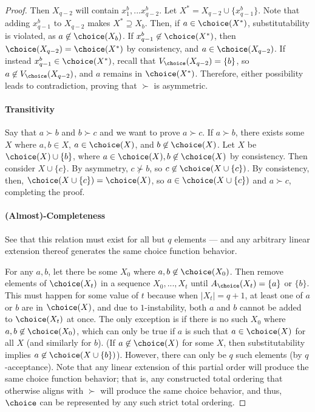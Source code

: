 \documentclass[10pt]{article}
\begin{document}
\begin{ReviewVerbatim}
\begin{proof}
Then $X_{q-2}$ will contain $x^b_1,...x^b_{q-2}$. Let $X^* = X_{q-2} \cup \{x^b_{q-1}\}$. Note that adding $x^b_{q-1}$ to $X_{q-2}$ makes $X^* \supseteq X_b$. Then, if $a \in \choice(X^*)$, substitutability is violated, as $a \not\in \choice(X_b)$. If $x^b_{q-1} \not\in \choice(X^*)$, then $\choice(X_{q-2}) = \choice(X^*)$ by consistency, and $a \in \choice(X_{q-2})$. If instead $x^b_{q-1} \in \choice(X^*)$, recall that $V_\choice(X_{q-2}) = \{b\}$, so $a \not\in V_\choice(X_{q-2})$, and $a$ remains in $\choice(X^*)$. Therefore, either possibility leads to contradiction, proving that $\succ$ is asymmetric.

\paragraph{Transitivity}
Say that $a \succ b$ and $b \succ c$ and we want to prove $a \succ c$. If $a \succ b$, there exists some $X$ where $a, b \in X$, $a \in \choice(X)$, and $b \not\in \choice(X)$. Let $X$ be $\choice(X) \cup \{b\}$, where $a \in \choice(X), b \not\in\choice(X)$ by consistency. Then consider $X \cup \{c\}$. By asymmetry, $c \not\succ b$, so $c \not\in \choice(X\cup \{c\})$. By consistency, then, $\choice(X\cup \{c\}) = \choice(X)$, so $a \in \choice(X\cup \{c\})$ and $a \succ c$, completing the proof.

\paragraph{(Almost)-Completeness}
See that this relation must exist for all but $q$ elements --- and any arbitrary linear extension thereof generates the same choice function behavior.

For any $a, b$, let there be some $X_0$ where $a, b \not\in \choice(X_0)$. Then remove elements of $\choice(X_t)$ in a sequence $X_0, ..., X_t$ until $A_\choice(X_t) = \{a\}$ or $\{b\}$. This must happen for some value of $t$ because when $|X_t| = q+1$, at least one of $a$ or $b$ are in $\choice(X)$, and due to $1$-instability, both $a$ and $b$ cannot be added to $\choice(X_t)$ at once. The only exception is if there is no such $X_0$ where $a, b \not\in \choice(X_0)$, which can only be true if $a$ is such that $a \in \choice(X)$ for all $X$ (and similarly for $b$). (If $a \not\in \choice(X)$ for some $X$, then substitutability implies $a \not\in \choice(X \cup \{b\})$). However, there can only be $q$ such elements (by $q$-acceptance). Note that any linear extension of this partial order will produce the same choice function behavior; that is, any constructed total ordering that otherwise aligns with $\succ$ will produce the same choice behavior, and thus, $\choice$ can be represented by any such strict total ordering.
\end{proof}
\end{ReviewVerbatim}
\end{document}
